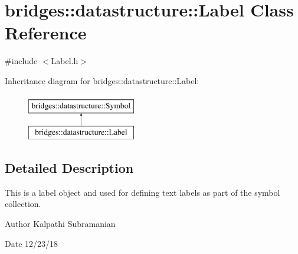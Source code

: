 \hypertarget{classbridges_1_1datastructure_1_1_label}{}\section{bridges\+::datastructure\+::Label Class Reference}
\label{classbridges_1_1datastructure_1_1_label}


{\ttfamily \#include $<$Label.\+h$>$}

Inheritance diagram for bridges\+::datastructure\+::Label\+:\begin{figure}[H]
\begin{center}
\leavevmode
\includegraphics[height=2.000000cm]{classbridges_1_1datastructure_1_1_label}
\end{center}
\end{figure}


\subsection{Detailed Description}
This is a label object and used for defining text labels as part of the symbol collection. 

\begin{DoxyAuthor}{Author}
Kalpathi Subramanian 
\end{DoxyAuthor}
\begin{DoxyDate}{Date}
12/23/18 
\end{DoxyDate}
